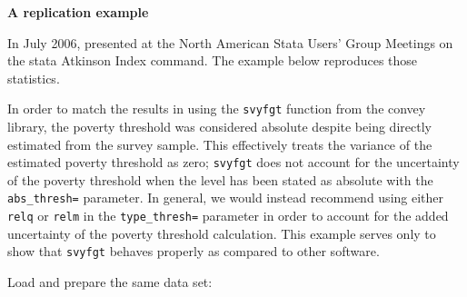 \documentclass[]{book}
\theoremstyle{definition}
\theoremstyle{definition}
\theoremstyle{remark}
\begin{document}
\textbf{A replication example}

In July 2006, \citep{jenkins2006} presented at the North American Stata
Users' Group Meetings on the stata Atkinson Index command. The example
below reproduces those statistics.

In order to match the results in \citep{jenkins2006} using the
\texttt{svyfgt} function from the convey library, the poverty threshold
was considered absolute despite being directly estimated from the survey
sample. This effectively treats the variance of the estimated poverty
threshold as zero; \texttt{svyfgt} does not account for the uncertainty
of the poverty threshold when the level has been stated as absolute with
the \texttt{abs\_thresh=} parameter. In general, we would instead
recommend using either \texttt{relq} or \texttt{relm} in the
\texttt{type\_thresh=} parameter in order to account for the added
uncertainty of the poverty threshold calculation. This example serves
only to show that \texttt{svyfgt} behaves properly as compared to other
software.

Load and prepare the same data set:
\end{document}
